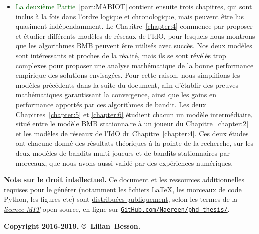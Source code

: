 \begin{resume_fr}
\begin{itemize}
    \item
\textcolor{darkgreen}{La deuxième Partie~\ref{part:MABIOT}} contient ensuite trois chapitres, qui sont inclus à la fois dans l'ordre logique et chronologique, mais peuvent être lus quasiment indépendamment.
Le Chapitre~\ref{chapter:4} commence par proposer et étudier différents modèles de réseaux de l'IdO, pour lesquels nous montrons que les algorithmes BMB peuvent être utilisés avec succès. Nos deux modèles sont intéressants et proches de la réalité, mais ils se sont révélés trop complexes pour proposer une analyse mathématique de la bonne performance empirique des solutions envisagées.
Pour cette raison, nous simplifions les modèles précédents dans la suite du document,
afin d'établir des preuves mathématiques garantissant la convergence, ainsi que les gains en performance apportés par ces algorithmes de bandit.
Les deux Chapitres~\ref{chapter:5} et \ref{chapter:6} étudient chacun un modèle intermédiaire, situé entre le modèle BMB stationnaire à un joueur du Chapitre~\ref{chapter:2} et les modèles de réseaux de l'IdO du Chapitre~\ref{chapter:4}.
Ces deux études ont chacune donné des résultats théoriques à la pointe de la recherche, sur les deux modèles de bandits multi-joueurs et de bandits stationnaires par morceaux, que nous avons aussi validé par des expériences numériques.

\end{itemize}


\vfill{}

\hr{}

\textbf{Note sur le droit intellectuel.}
%
Ce document et les ressources additionnelles requises pour le générer (notamment les fichiers \LaTeX, les morceaux de code Python, les figures etc)
sont \href{https://github.com/Naereen/phd-thesis/}{distribuées publiquement},
selon les termes de la \href{https://lbesson.mit-license.org/}{\emph{licence MIT}} open-source,
en ligne sur \href{https://github.com/Naereen/phd-thesis/}{\texttt{GitHub.com/Naereen/phd-thesis/}}.


\begin{center}
    \textbf{Copyright 2016-2019, \copyright ~Lilian~Besson.}
\end{center}


\end{resume_fr}
